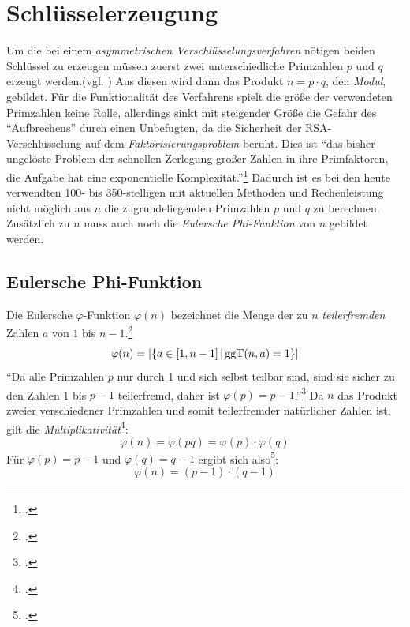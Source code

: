 \documentclass{scrarticle}
\begin{document}
    \section{Schlüsselerzeugung}
        Um die bei einem \emph{asymmetrischen Verschlüsselungsverfahren} nötigen beiden Schlüssel zu erzeugen müssen zuerst zwei unterschiedliche Primzahlen $p$ und $q$ erzeugt werden.(vgl. \cite[278]{dankmeier2006}) Aus diesen wird dann das Produkt $n=p\cdot q$, den \emph{Modul}, gebildet. Für die Funktionalität des Verfahrens spielt die größe der verwendeten Primzahlen keine Rolle, allerdings sinkt mit steigender Größe die Gefahr des \enquote{Aufbrechens} durch einen Unbefugten, da die Sicherheit der RSA-Verschlüsselung auf dem \emph{Faktorisierungsproblem} beruht. Dies ist \enquote{das bisher ungelöste Problem der schnellen Zerlegung großer Zahlen in ihre Primfaktoren, die Aufgabe hat eine exponentielle Komplexität.}\footcite[279]{dankmeier2006} Dadurch ist es bei den heute verwendten 100- bis 350-stelligen mit aktuellen Methoden und Rechenleistung nicht möglich aus $n$ die zugrundeliegenden Primzahlen $p$ und $q$ zu berechnen. %
        Zusätzlich zu $n$ muss auch noch die \emph{Eulersche Phi-Funktion} von $n$ gebildet werden.
        \subsection{Eulersche Phi-Funktion}
            Die Eulersche $\varphi$-Funktion $\varphi(n)$ bezeichnet die Menge der zu $n$ \emph{teilerfremden} Zahlen $a$ von $1$ bis $n-1$.\footcite[vgl.][111]{swoboda2008kryptographie}
            \begin{equation}
                \varphi(n)= |\{a\in \left[ 1, n-1 \right] | \operatorname{ggT}(n, a)=1\}|
            \end{equation}
            \enquote{Da alle Primzahlen $p$ nur durch 1 und sich selbst teilbar sind, sind sie sicher zu den Zahlen 1 bis $p-1$ teilerfremd, daher ist $\varphi(p) = p-1$.}\footcite{steinfeld}
            Da $n$ das Produkt zweier verschiedener Primzahlen und somit teilerfremder natürlicher Zahlen ist, gilt die \emph{Multiplikativität}\footcite[vgl.][]{steinfeld}:
            \begin{equation}
                \varphi(n) = \varphi(pq) = \varphi(p)\cdot\varphi(q)
            \end{equation}
            Für $\varphi(p) = p-1$ und $\varphi(q) = q-1$ ergibt sich also\footcite[vgl.][279]{dankmeier2006}:
            \begin{equation}
                \varphi(n) = (p-1)\cdot(q-1)
            \end{equation}
\end{document}
